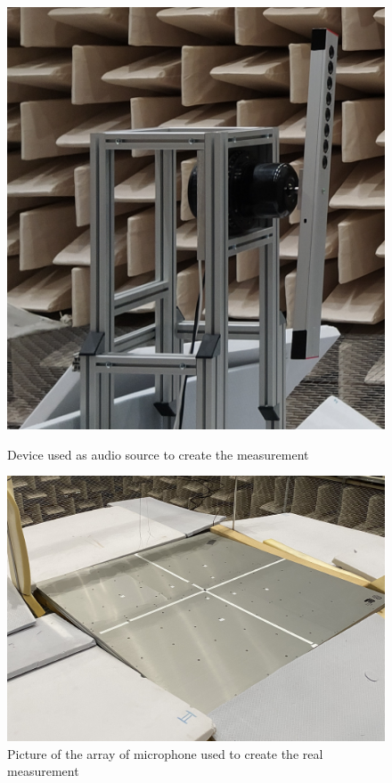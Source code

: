 \documentclass[11pt,a4paper,twoside]{report}
\begin{document}
\begin{figure}
    \centering
    \begin{minipage}{0.45\textwidth}
        \includegraphics[width=1\textwidth]{figs/source.png}
        \caption{Device used as audio source to create the measurement}
        \label{fig:source}
    \end{minipage}\hfill
    \begin{minipage}{0.5\textwidth}
        \includegraphics[width=1\textwidth]{figs/microphone_array_cropped.jpg}
        \caption{Picture of the array of microphone used to create the real measurement}
        \label{fig:microphone_array}
    \end{minipage}
\end{figure}
\end{document}
